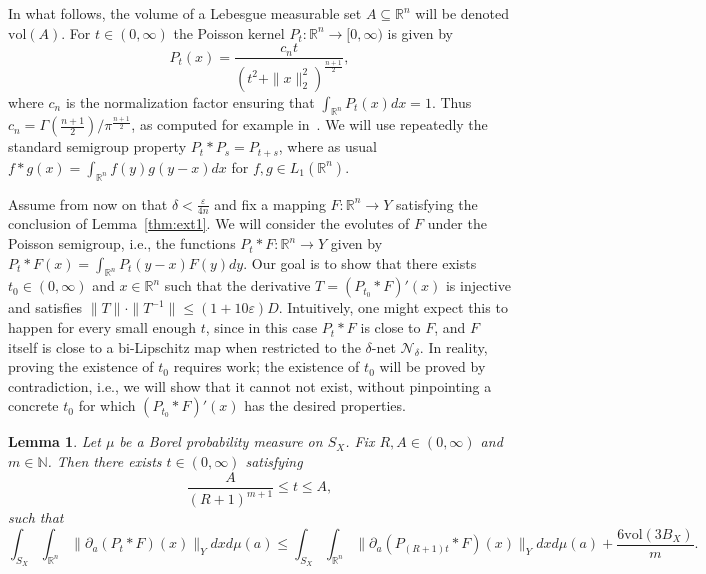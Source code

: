 \documentclass[12pt,reqno]{amsart}
\theoremstyle{plain}
\newtheorem{lemma}[theorem]{Lemma}
\theoremstyle{definition}
\newcommand{\N}{\mathbb N}
\newcommand{\e}{\varepsilon}
\renewcommand{\d}{\delta}
\renewcommand{\le}{\leqslant}
\newcommand{\R}{\mathbb R}
\newcommand{\vol}{\mathrm{vol}}
\newcommand{\n}{\mathcal N}
\begin{document}
In what follows, the volume of a Lebesgue measurable set $A\subseteq \R^n$ will be denoted $\vol(A)$. For $t\in (0,\infty)$ the Poisson kernel $P_t:\R^n\to [0,\infty)$ is given by
$$
P_t(x) = \frac {c_nt} {\left(t^2+\|x\|_2^2\right)^{\frac{n+1}{2}}},
$$
where $c_n$ is the normalization factor ensuring that $\int_{\R^n} P_t(x)dx=1$.  Thus $c_n = \Gamma\left(\frac{n+1}2\right)/\pi^{\frac{n+1}2}$, as computed for example in~\cite[Sec.~X.3]{Tor86}. We will use repeatedly the standard semigroup property $P_t*P_s=P_{t+s}$, where as usual $f*g(x)=\int_{\R^n}f(y)g(y-x)dx$ for $f,g\in L_1(\R^n)$.

Assume from now on that $\delta<\frac{\e}{4n}$ and fix a mapping $F:\R^n\to Y$ satisfying the conclusion of Lemma~\ref{thm:ext1}. We will consider the  evolutes of $F$ under the Poisson semigroup, i.e., the functions $P_t*F: \R^n\to Y$ given by  $P_t*F(x)=\int_{\R^n}P_t(y-x)F(y)dy$. Our goal is to show that there exists $t_0\in (0,\infty)$ and $x\in \R^n$ such that the derivative $T=(P_{t_0}*F)'(x)$ is injective and satisfies $\|T\|\cdot\|T^{-1}\|\le (1+10\e)D$. Intuitively, one might expect this to happen for every small enough $t$, since in this case $P_t*F$ is close to $F$, and $F$ itself is close to a bi-Lipschitz map when restricted to the $\d$-net $\n_\d$. In reality, proving the existence of $t_0$ requires work; the existence of $t_0$ will be proved by contradiction, i.e., we will show that it cannot not exist, without pinpointing a concrete $t_0$ for which  $(P_{t_0}*F)'(x)$ has the desired properties.

\begin{lemma}\label{lem:contradiction}
Let $\mu$ be a Borel probability measure on $S_X$. Fix $R,A\in (0,\infty)$ and $m\in \N$. Then there exists $t\in (0,\infty)$ satisfying
\begin{equation}\label{eq:t range1}
\frac{A}{(R+1)^{m+1}}\le t\le A,
\end{equation}
such that
\begin{equation}\label{eq:stabilization}
\int_{S_X}\int_{\R^n} \|\partial_a(P_t*F)(x)\|_Ydxd\mu(a)\le \int_{S_X}\int_{\R^n} \|\partial_a(P_{(R+1)t}*F)(x)\|_Ydxd\mu(a)+\frac{6\vol(3B_X)}{m}.
\end{equation}
\end{lemma}
\end{document}

